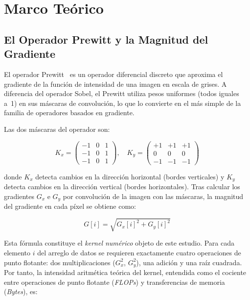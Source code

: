 \section{Marco Te\'orico}

\subsection{El Operador Prewitt y la Magnitud del Gradiente}

El operador Prewitt~\cite{gonzalez2008,prewitt1970} es un operador diferencial
discreto que aproxima el gradiente de la funci\'on de intensidad
de una imagen en escala de grises.
A diferencia del operador Sobel, el Prewitt utiliza pesos uniformes
(todos iguales a~1) en sus m\'ascaras de convoluci\'on, lo que lo
convierte en el m\'as simple de la familia de operadores basados
en gradiente.

Las dos m\'ascaras del operador son:

\begin{equation}
  K_x = \begin{pmatrix}
    -1 & 0 & 1 \\
    -1 & 0 & 1 \\
    -1 & 0 & 1
  \end{pmatrix}, \quad
  K_y = \begin{pmatrix}
    +1 & +1 & +1 \\
     0 &  0 &  0 \\
    -1 & -1 & -1
  \end{pmatrix}
  \label{eq:mascaras}
\end{equation}

donde $K_x$ detecta cambios en la direcci\'on horizontal (bordes
verticales) y $K_y$ detecta cambios en la direcci\'on vertical
(bordes horizontales).
Tras calcular los gradientes $G_x$ e $G_y$ por convoluci\'on de
la imagen con las m\'ascaras, la magnitud del gradiente en cada
p\'ixel se obtiene como:

\begin{equation}
  G[i] = \sqrt{G_x[i]^2 + G_y[i]^2}
  \label{eq:magnitud}
\end{equation}

Esta f\'ormula constituye el \textit{kernel num\'erico} objeto de
este estudio.
Para cada elemento $i$ del arreglo de datos se requieren exactamente
cuatro operaciones de punto flotante: dos multiplicaciones
($G_x^2$, $G_y^2$), una adici\'on y una ra\'iz cuadrada.
Por tanto, la intensidad aritm\'etica te\'orica del kernel,
entendida como el cociente entre operaciones de punto flotante
(\textit{FLOPs}) y transferencias de memoria (\textit{Bytes}), es:

